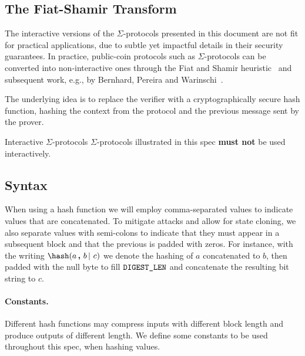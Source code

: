 \documentclass[11pt]{article}
\begin{document}
\subsection{The Fiat-Shamir Transform}\label{sec:fs}

The interactive versions of the $\Sigma$-protocols presented in this document are not fit for practical applications, due to subtle yet impactful details in their security guarantees.
In practice, public-coin protocols such as $\Sigma$-protocols can be converted into non-interactive ones through the
Fiat and Shamir heuristic~\cite{C:FiaSha86} and subsequent work, e.g., by Bernhard, Pereira and Warinschi~\cite{AC:BerPerWar12}.

The underlying idea is to replace the verifier with a cryptographically secure hash function, hashing the context from the protocol and the previous message sent by the prover.

\begin{warning}{Interactive $\Sigma$-protocols}{} $\Sigma$-protocols illustrated in this spec \textbf{must not} be used interactively.
\end{warning}

\subsection{Syntax}

When using a hash function we will employ comma-separated values to indicate values that are concatenated.
To mitigate attacks and allow for state cloning, we also separate values with semi-colons
to indicate that they must appear in a subsequent block and that the previous is padded with zeros. For instance, with the writing $\hash(a \concat b \concatblock c)$ we denote the hashing of $a$ concatenated to $b$, then padded with the null byte to fill $\texttt{DIGEST\_LEN}$ and concatenate the resulting bit string to $c$.

\paragraph{Constants.} Different hash functions may compress inputs with different block length and produce outputs of different length. We define some constants to be used throughout this spec, when hashing values.
\end{document}
